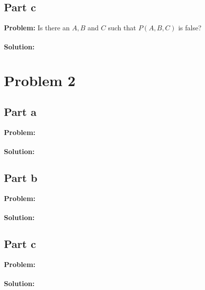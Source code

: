 \documentclass{article}
\begin{document}
\subsection*{Part c}
\textbf{Problem:} Is there an $A,B$ and $C$ such that $P(A,B,C)$ is false?
\\\\
\textbf{Solution:}

\section*{Problem 2}
\subsection*{Part a}
\textbf{Problem:}
\\\\
\textbf{Solution:}

\subsection*{Part b}
\textbf{Problem:}
\\\\
\textbf{Solution:}

\subsection*{Part c}
\textbf{Problem:}
\\\\
\textbf{Solution:}
\end{document}
